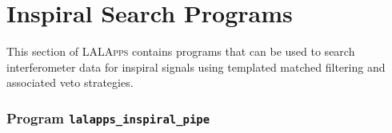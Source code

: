 %

\chapter{Inspiral Search Programs}
\label{chapter:inspiral}

This section of \textsc{LALApps} contains programs that can be used to search
interferometer data for inspiral signals using templated matched filtering and
associated veto strategies.

\clearpage
\subsection{Program \texttt{lalapps\_inspiral\_pipe}}
\label{program:inspiral-pipeline}

